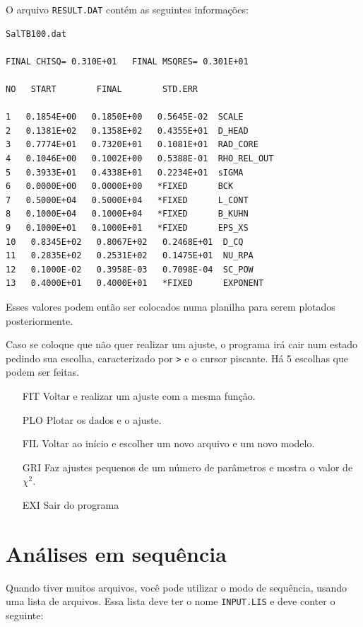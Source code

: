 \begin{apendicesenv}
O arquivo \texttt{RESULT.DAT} contém as seguintes informações:

\begin{verbatim}
SalTB100.dat

FINAL CHISQ= 0.310E+01   FINAL MSQRES= 0.301E+01

NO   START        FINAL        STD.ERR

1   0.1854E+00   0.1850E+00   0.5645E-02  SCALE               
2   0.1381E+02   0.1358E+02   0.4355E+01  D_HEAD              
3   0.7774E+01   0.7320E+01   0.1081E+01  RAD_CORE            
4   0.1046E+00   0.1002E+00   0.5388E-01  RHO_REL_OUT         
5   0.3933E+01   0.4338E+01   0.2234E+01  sIGMA               
6   0.0000E+00   0.0000E+00   *FIXED      BCK                 
7   0.5000E+04   0.5000E+04   *FIXED      L_CONT              
8   0.1000E+04   0.1000E+04   *FIXED      B_KUHN              
9   0.1000E+01   0.1000E+01   *FIXED      EPS_XS              
10   0.8345E+02   0.8067E+02   0.2468E+01  D_CQ                
11   0.2835E+02   0.2531E+02   0.1475E+01  NU_RPA              
12   0.1000E-02   0.3958E-03   0.7098E-04  SC_POW              
13   0.4000E+01   0.4000E+01   *FIXED      EXPONENT            
\end{verbatim}

Esses valores podem então ser colocados numa planilha para serem plotados posteriormente.

Caso se coloque que não quer realizar um ajuste, o programa irá cair num estado pedindo sua escolha, caracterizado por \texttt{>} e o cursor piscante. Há 5 escolhas que podem ser feitas.

\begin{itemize}
	\item[FIT] Voltar e realizar um ajuste com a mesma função.
	\item[PLO] Plotar os dados e o ajuste.
	\item[FIL] Voltar ao início e escolher um novo arquivo e um novo modelo.
	\item[GRI] Faz ajustes pequenos de um número de parâmetros e mostra o valor de \(\chi^2\).
	\item[EXI] Sair do programa
\end{itemize}

\section{Análises em sequência}
\label{sec:script_saxs_sequencia}
Quando tiver muitos arquivos, você pode utilizar o modo de sequência, usando uma lista de arquivos. Essa lista deve ter o nome \texttt{INPUT.LIS} e deve conter o seguinte:


\end{apendicesenv}
